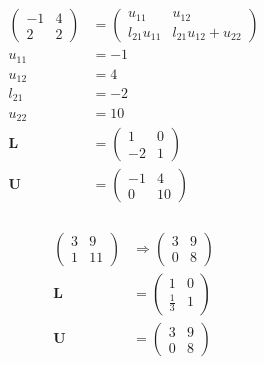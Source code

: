 \documentclass{article}
\begin{document}
\begin{align*}
  \begin{pmatrix}
    -1 & 4 \\
    2  & 2
  \end{pmatrix} & = \begin{pmatrix}
                      u_{11}        & u_{12}                 \\
                      l_{21} u_{11} & l_{21} u_{12} + u_{22}
                    \end{pmatrix} \\
  u_{11}          & = -1                                   \\
  u_{12}          & = 4                                    \\
  l_{21}          & = -2                                   \\
  u_{22}          & = 10                                   \\
  \mathbf{L}      & = \begin{pmatrix}
                        1  & 0 \\
                        -2 & 1
                      \end{pmatrix}                       \\
  \mathbf{U}      & = \begin{pmatrix}
                        -1 & 4  \\
                        0  & 10
                      \end{pmatrix}
\end{align*}

\setcounter{subsubsection}{10}
\subsubsection{}

\begin{align*}
  \begin{pmatrix}
    3 & 9  \\
    1 & 11
  \end{pmatrix} & \Rightarrow \begin{pmatrix}
                                3 & 9 \\
                                0 & 8
                              \end{pmatrix} \\
  \mathbf{L}      & = \begin{pmatrix}
                        1           & 0 \\
                        \frac{1}{3} & 1
                      \end{pmatrix}        \\
  \mathbf{U}      & = \begin{pmatrix}
                        3 & 9 \\
                        0 & 8
                      \end{pmatrix}
\end{align*}
\end{document}
